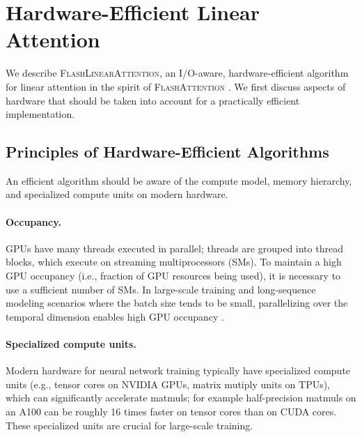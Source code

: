 \vspace{-2mm}
\section{Hardware-Efficient Linear Attention}
\vspace{-2mm}
\label{sec:algorithm}
We describe \textsc{FlashLinearAttention}, an I/O-aware, hardware-efficient algorithm for linear attention in the spirit of \textsc{FlashAttention} \cite{flashattention1,flashattention2}. We first discuss aspects of hardware that should be taken into account for a practically efficient implementation.

\vspace{-2mm}
\subsection{Principles of Hardware-Efficient Algorithms}
\vspace{-2mm}
 An efficient  algorithm should be aware of the compute model, memory hierarchy, and specialized compute units on modern hardware. 

\vspace{-2mm}
\paragraph{Occupancy.} GPUs have many threads executed in parallel; threads are grouped into thread blocks, which execute on streaming multiprocessors (SMs). To maintain a high GPU occupancy (i.e., fraction of GPU resources being used), it is necessary to use a sufficient number of SMs. 
In large-scale training and long-sequence modeling scenarios where the batch size tends to be small, 
parallelizing over the temporal dimension enables high GPU occupancy \cite{flashattention2}. 

\vspace{-2mm}
\paragraph{Specialized compute units.} Modern hardware for neural network training typically have specialized compute units (e.g., {tensor cores} on NVIDIA GPUs, matrix mutiply units on TPUs), which can significantly accelerate matmuls; for example half-precision matmuls
on an A100 can be roughly 16 times faster on tensor cores than on CUDA cores. These specialized units are crucial for large-scale training.

\vspace{-2mm}
